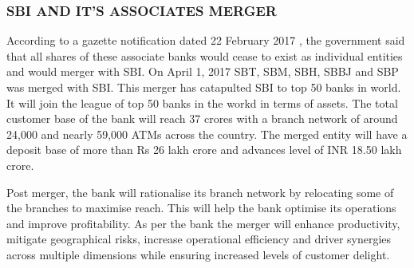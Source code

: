\documentclass[a4paper, 12pt]{extarticle}
\begin{document}
{\subsubsection {SBI AND IT'S ASSOCIATES MERGER}
\par According to a gazette notification dated 22 February 2017 , the government said that all shares of these associate banks would cease to exist as individual entities and would merger with SBI. On April 1, 2017 SBT, SBM, SBH, SBBJ and SBP was merged with SBI. This merger has catapulted SBI to top 50 banks in world. It will join the league of top 50 banks in the workd in terms of assets. The total customer base of the bank will reach 37 crores with a branch network of around 24,000 and nearly 59,000 ATMs across the country. The merged entity will have a deposit base of more than Rs 26 lakh crore and advances level of INR 18.50 lakh crore.
\par Post merger, the bank will rationalise its branch network by relocating some of the branches to maximise reach. This will help the bank optimise its operations and improve profitability. As per the bank the merger will enhance productivity, mitigate geographical risks, increase operational efficiency and driver synergies across multiple dimensions while ensuring increased levels of customer delight.

}
\end{document}
